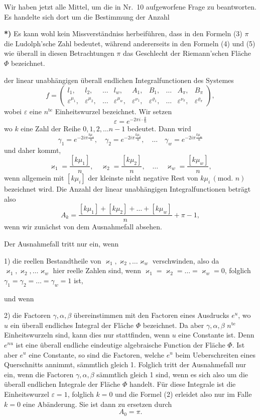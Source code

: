 \documentclass{article}
\begin{document}
Wir haben jetzt alle Mittel, um die in Nr.~10 aufgeworfene Frage zu beantworten. Es handelte sich dort um die Bestimmung der Anzahl

\textbf{*)} Es kann wohl kein Missverständniss herbeiführen, dass in den Formeln (3) $\pi$ die Ludolph'sche Zahl bedeutet, während andererseits in den Formeln (4) und (5) wie überall in diesen Betrachtungen $\pi$ das Geschlecht der Riemann'schen Fläche $\Phi$ bezeichnet.

der linear unabhängigen überall endlichen Integralfunctionen des Systemes
\[
f = \begin{pmatrix}
l_1, & l_2, & \dots & l_w, & A_1, & B_1, & \dots & A_\pi, & B_\pi \\
\varepsilon^{\mu_1}, & \varepsilon^{\mu_2}, & \dots & \varepsilon^{\mu_w}, & \varepsilon^{\nu_1}, & \varepsilon^{\varrho_1}, & \dots & \varepsilon^{\nu_\pi}, & \varepsilon^{\varrho_\pi}
\end{pmatrix},
\]
wobei $\varepsilon$ eine $n^{\text{te}}$ Einheitswurzel bezeichnet. Wir setzen
\[
\varepsilon = e^{-2\pi i \cdot \frac{k}{n}} \tag{1}
\]
wo $k$ eine Zahl der Reihe $0, 1, 2, \dots n-1$ bedeutet. Dann wird
\[
\gamma_1 = e^{-2i\pi\frac{k\mu_1}{n}}, \quad \gamma_2 = e^{-2i\pi\frac{k\mu_2}{n}}, \quad \dots \quad \gamma_w = e^{-2i\pi\frac{k\mu_w}{n}}
\]
und daher kommt,
\[
\varkappa_1 = \frac{[k\mu_1]}{n}, \quad \varkappa_2 = \frac{[k\mu_2]}{n}, \quad \dots \quad \varkappa_w = \frac{[k\mu_w]}{n},
\]
wenn allgemein mit $[k\mu_i]$ der kleinste nicht negative Rest von $k\mu_i\,(\text{mod. } n)$ bezeichnet wird. Die Anzahl der linear unabhängigen Integralfunctionen beträgt also
\[
A_k = \frac{[k\mu_1] + [k\mu_2] + \dots + [k\mu_w]}{n} + \pi - 1, \tag{2}
\]
wenn wir zunächst von dem Ausnahmefall absehen.

Der Ausnahmefall tritt nur ein, wenn

1) die reellen Bestandtheile von $\varkappa_1, \varkappa_2, \dots \varkappa_w$ verschwinden, also da $\varkappa_1, \varkappa_2, \dots \varkappa_w$ hier reelle Zahlen sind, wenn $\varkappa_1 = \varkappa_2 = \dots = \varkappa_w = 0$, folglich $\gamma_1 = \gamma_2 = \dots = \gamma_w = 1$ ist,

und wenn

2) die Factoren $\gamma, \alpha, \beta$ übereinstimmen mit den Factoren eines Ausdrucks $e^u$, wo $u$ ein überall endliches Integral der Fläche $\Phi$ bezeichnet. Da aber $\gamma, \alpha, \beta$ $n^{\text{te}}$ Einheitswurzeln sind, kann dies nur stattfinden, wenn $u$ eine Constante ist. Denn $e^{nu}$ ist eine überall endliche eindeutige algebraische Function der Fläche $\Phi$. Ist aber $e^u$ eine Constante, so sind die Factoren, welche $e^u$ beim Ueberschreiten eines Querschnitts annimmt, sämmtlich gleich 1. Folglich tritt der Ausnahmefall nur ein, wenn die Factoren $\gamma, \alpha, \beta$ sämmtlich gleich 1 sind, wenn es sich also um die überall endlichen Integrale der Fläche $\Phi$ handelt.
Für diese Integrale ist die Einheitswurzel $\varepsilon = 1$, folglich $k = 0$ und die Formel (2) erleidet also nur im Falle $k = 0$ eine Abänderung. Sie ist dann zu ersetzen durch
\[
A_0 = \pi. \tag{3}
\]
\end{document}
